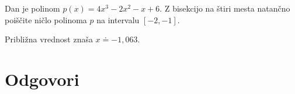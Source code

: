\begin{vaja}
Dan je polinom $p(x)=4x^3-2x^2-x+6$. Z bisekcijo na štiri mesta natančno poiščite ničlo
polinoma $p$ na intervalu $[-2,-1]$.


\begin{odgovor}
Približna vrednost znaša $x\doteq -1,063$.
\end{odgovor}

\end{vaja}









\section{Odgovori}
\label{sec:polinomi-odgovori}





